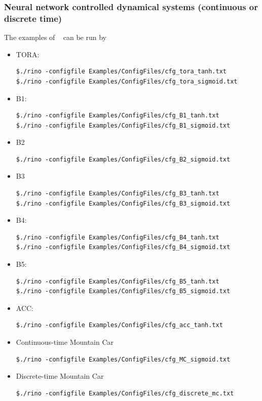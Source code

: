 \documentclass{article}
\begin{document}
\subsubsection{Neural network controlled dynamical systems (continuous or discrete time)}
The  examples of ~\cite{cav22} can be run by
\begin{itemize}[noitemsep]
\item TORA:
\begin{verbatim}
$./rino -configfile Examples/ConfigFiles/cfg_tora_tanh.txt
$./rino -configfile Examples/ConfigFiles/cfg_tora_sigmoid.txt
\end{verbatim}
\item B1:
\begin{verbatim}
$./rino -configfile Examples/ConfigFiles/cfg_B1_tanh.txt
$./rino -configfile Examples/ConfigFiles/cfg_B1_sigmoid.txt
\end{verbatim}
\item B2
\begin{verbatim}
$./rino -configfile Examples/ConfigFiles/cfg_B2_sigmoid.txt
\end{verbatim}
\item B3
\begin{verbatim}
$./rino -configfile Examples/ConfigFiles/cfg_B3_tanh.txt
$./rino -configfile Examples/ConfigFiles/cfg_B3_sigmoid.txt
\end{verbatim}
\item B4:
\begin{verbatim}
$./rino -configfile Examples/ConfigFiles/cfg_B4_tanh.txt
$./rino -configfile Examples/ConfigFiles/cfg_B4_sigmoid.txt
\end{verbatim}
\item B5:
\begin{verbatim}
$./rino -configfile Examples/ConfigFiles/cfg_B5_tanh.txt
$./rino -configfile Examples/ConfigFiles/cfg_B5_sigmoid.txt
\end{verbatim}
\item ACC:
\begin{verbatim}
$./rino -configfile Examples/ConfigFiles/cfg_acc_tanh.txt
\end{verbatim}
\item Continuous-time Mountain Car
\begin{verbatim}
$./rino -configfile Examples/ConfigFiles/cfg_MC_sigmoid.txt
\end{verbatim}
\item Discrete-time Mountain Car
\begin{verbatim}
$./rino -configfile Examples/ConfigFiles/cfg_discrete_mc.txt
\end{verbatim}
\end{itemize}
\end{document}
